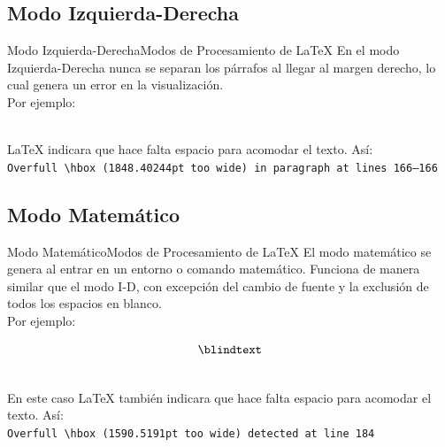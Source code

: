\documentclass[12pt,aspectratio=43]{beamer}
\newcommand{\lmr}{\fontfamily{lmr}\selectfont}
\begin{document}
\subsection{Modo Izquierda-Derecha}
\begin{frame}{Modo Izquierda-Derecha}{Modos de Procesamiento de {\lmr\LaTeX}}
En el modo Izquierda-Derecha nunca se separan los párrafos al llegar al margen derecho, lo cual genera un error en la visualización.\pause\\[1em]

Por ejemplo:\\[1em]

\begin{minipage}[c]{\linewidth}\hfuzz=2000pt %
	\mbox{\lmr\blindtext}
\end{minipage}\pause\\[1em]

{\lmr\LaTeX} indicara que hace falta espacio para acomodar el texto. Así:\\[1em]

\texttt{Overfull \textbackslash{}hbox (1848.40244pt too wide) in paragraph at lines 166--166}
\end{frame}

\subsection{Modo Matemático}
\begin{frame}{Modo Matemático}{Modos de Procesamiento de {\lmr\LaTeX}}
El modo matemático se genera al entrar en un entorno o comando matemático. Funciona de manera similar que el modo I-D, con excepción del cambio de fuente y la exclusión de todos los espacios en blanco.\pause\\[1em]

Por ejemplo:\\[-0.5em]

\begin{minipage}[c]{\linewidth}\hfuzz=2000pt %
	\[\blindtext\]
\end{minipage}\pause\\[1em]

En este caso {\lmr\LaTeX} también indicara que hace falta espacio para acomodar el texto. Así:\\[1em]

\texttt{Overfull \textbackslash{}hbox (1590.5191pt too wide) detected at line 184}
\end{frame}
\end{document}
